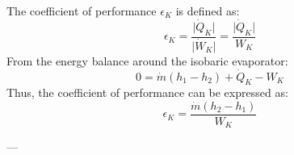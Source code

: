 The coefficient of performance \( \epsilon_K \) is defined as:  
\[
\epsilon_K = \frac{\lvert \dot{Q}_K \rvert}{\lvert \dot{W}_K \rvert} = \frac{\lvert \dot{Q}_K \rvert}{W_K}
\]  
From the energy balance around the isobaric evaporator:  
\[
0 = \dot{m} (h_1 - h_2) + \dot{Q}_K - W_K
\]  
Thus, the coefficient of performance can be expressed as:  
\[
\epsilon_K = \frac{\dot{m} (h_2 - h_1)}{W_K}
\]

---